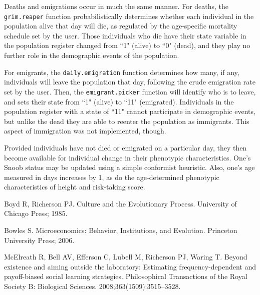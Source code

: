 \documentclass[11pt]{article}
\begin{document}
Deaths and emigrations occur in much the same manner.  For deaths, the \texttt{grim.reaper} function probabilistically determines whether each individual in the population alive that day will die, as regulated by the age-specific mortality schedule set by the user.  Those individuals who die have their state variable in the population register changed from ``1" (alive) to ``0" (dead), and they play no further role in the demographic events of the population.  

For emigrants, the \texttt{daily.emigration} function determines how many, if any, individuals will leave the population that day, following the crude emigration rate set by the user.  Then, the \texttt{emigrant.picker} function will identify who is to leave, and sets their state from ``1" (alive) to ``11" (emigrated).  Individuals in the population register with a state of ``11" cannot participate in demographic events, but unlike the dead they are able to reenter the population as immigrants.  This aspect of immigration was not implemented, though.  

Provided individuals have not died or emigrated on a particular day, they then become available for individual change in their phenotypic characteristics.  One's Snoob status may be updated using a simple conformist heuristic.  Also, one's age measured in days increases by 1, as do the age-determined phenotypic characteristics of height and risk-taking score.   





\begin{thebibliography}{10}


Boyd R, Richerson PJ.
\newblock Culture and the Evolutionary Process.
\newblock University of Chicago Press; 1985.


Bowles S.
\newblock Microeconomics: Behavior, Institutions, and Evolution.
\newblock Princeton University Press; 2006.


McElreath R, Bell AV, Efferson C, Lubell M, Richerson PJ, Waring T.
\newblock Beyond existence and aiming outside the laboratory: Estimating
  frequency-dependent and payoff-biased social learning strategies.
\newblock Philosophical Transactions of the Royal Society B: Biological
  Sciences. 2008;363(1509):3515--3528.

\end{thebibliography}
\end{document}
